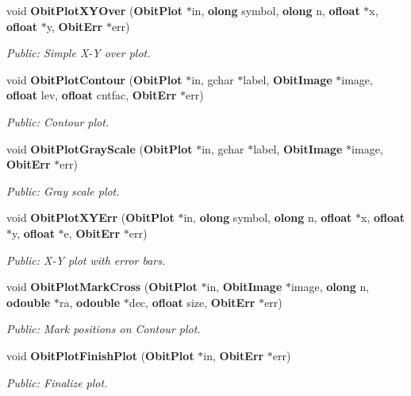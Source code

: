 \begin{CompactItemize}
void {\bf Obit\-Plot\-XYOver} ({\bf Obit\-Plot} $\ast$in, {\bf olong} symbol, {\bf olong} n, {\bf ofloat} $\ast$x, {\bf ofloat} $\ast$y, {\bf Obit\-Err} $\ast$err)
\begin{CompactList}\small\item\em Public: Simple X-Y over plot. \item\end{CompactList}\item 
void {\bf Obit\-Plot\-Contour} ({\bf Obit\-Plot} $\ast$in, gchar $\ast$label, {\bf Obit\-Image} $\ast$image, {\bf ofloat} lev, {\bf ofloat} cntfac, {\bf Obit\-Err} $\ast$err)
\begin{CompactList}\small\item\em Public: Contour plot. \item\end{CompactList}\item 
void {\bf Obit\-Plot\-Gray\-Scale} ({\bf Obit\-Plot} $\ast$in, gchar $\ast$label, {\bf Obit\-Image} $\ast$image, {\bf Obit\-Err} $\ast$err)
\begin{CompactList}\small\item\em Public: Gray scale plot. \item\end{CompactList}\item 
void {\bf Obit\-Plot\-XYErr} ({\bf Obit\-Plot} $\ast$in, {\bf olong} symbol, {\bf olong} n, {\bf ofloat} $\ast$x, {\bf ofloat} $\ast$y, {\bf ofloat} $\ast$e, {\bf Obit\-Err} $\ast$err)
\begin{CompactList}\small\item\em Public: X-Y plot with error bars. \item\end{CompactList}\item 
void {\bf Obit\-Plot\-Mark\-Cross} ({\bf Obit\-Plot} $\ast$in, {\bf Obit\-Image} $\ast$image, {\bf olong} n, {\bf odouble} $\ast$ra, {\bf odouble} $\ast$dec, {\bf ofloat} size, {\bf Obit\-Err} $\ast$err)
\begin{CompactList}\small\item\em Public: Mark positions on Contour plot. \item\end{CompactList}\item 
void {\bf Obit\-Plot\-Finish\-Plot} ({\bf Obit\-Plot} $\ast$in, {\bf Obit\-Err} $\ast$err)
\begin{CompactList}\small\item\em Public: Finalize plot. \item\end{CompactList}\item 

\end{CompactItemize}
